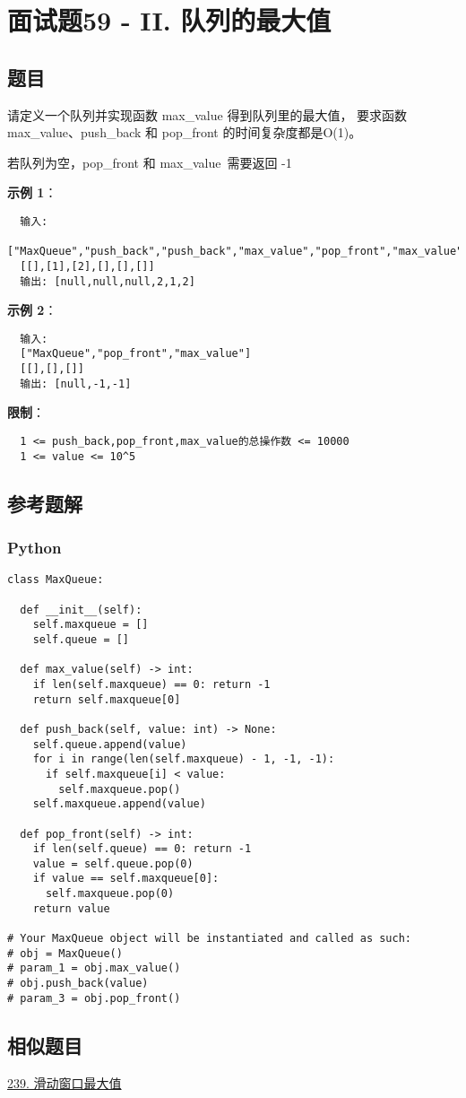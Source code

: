 \newpage
\section{面试题59 - II. 队列的最大值}
\label{leetcode:sw_59_2}

\subsection{题目}

请定义一个队列并实现函数 max\_value 得到队列里的最大值，
要求函数 max\_value、push\_back 和 pop\_front 的时间复杂度都是O(1)。

若队列为空，pop\_front 和 max\_value 需要返回 -1

\textbf{示例 1}：

\begin{verbatim}
  输入:
  ["MaxQueue","push_back","push_back","max_value","pop_front","max_value"]
  [[],[1],[2],[],[],[]]
  输出: [null,null,null,2,1,2]
\end{verbatim}

\textbf{示例 2}：

\begin{verbatim}
  输入:
  ["MaxQueue","pop_front","max_value"]
  [[],[],[]]
  输出: [null,-1,-1]
\end{verbatim}

\textbf{限制}：

\begin{verbatim}
  1 <= push_back,pop_front,max_value的总操作数 <= 10000
  1 <= value <= 10^5
\end{verbatim}

\subsection{参考题解}

\subsubsection{Python}

\begin{verbatim}
class MaxQueue:

  def __init__(self):
    self.maxqueue = []
    self.queue = []

  def max_value(self) -> int:
    if len(self.maxqueue) == 0: return -1
    return self.maxqueue[0]

  def push_back(self, value: int) -> None:
    self.queue.append(value)
    for i in range(len(self.maxqueue) - 1, -1, -1):
      if self.maxqueue[i] < value:
        self.maxqueue.pop()
    self.maxqueue.append(value)

  def pop_front(self) -> int:
    if len(self.queue) == 0: return -1
    value = self.queue.pop(0)
    if value == self.maxqueue[0]:
      self.maxqueue.pop(0)
    return value

# Your MaxQueue object will be instantiated and called as such:
# obj = MaxQueue()
# param_1 = obj.max_value()
# obj.push_back(value)
# param_3 = obj.pop_front()
\end{verbatim}

\subsection{相似题目}

\hyperref[leetcode:239]{239. 滑动窗口最大值}
